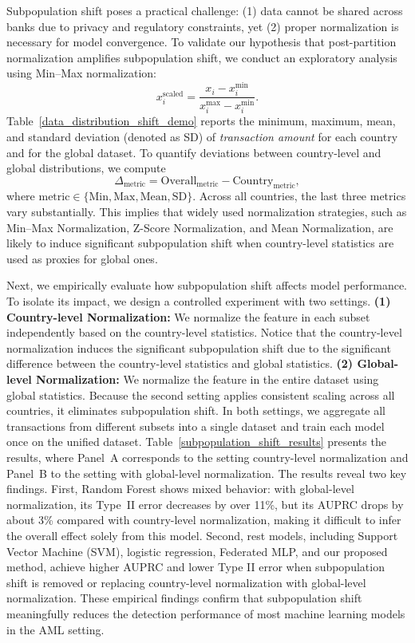 \documentclass[11pt,english]{article}
\begin{document}
Subpopulation shift poses a practical challenge: (1) data cannot be shared across banks due to privacy and regulatory constraints, yet (2) proper normalization is necessary for model convergence. To validate our hypothesis that post-partition normalization amplifies subpopulation shift, we conduct an exploratory analysis using Min--Max normalization:
\begin{equation}
    \label{min_max_normalization}
    x^{\text{scaled}}_i = \frac{x_i - x^{\text{min}}_i}{x^{\text{max}}_i - x^{\text{min}}_i}.
\end{equation}
Table~\ref{data_distribution_shift_demo} reports the minimum, maximum, mean, and standard deviation (denoted as SD) of \emph{transaction amount} for each country and for the global dataset. To quantify deviations between country-level and global distributions, we compute
\begin{equation}
    \Delta_{\text{metric}} = \text{Overall}_{\text{metric}} - \text{Country}_{\text{metric}},
\end{equation}
where $\text{metric} \in \{\text{Min}, \text{Max}, \text{Mean}, \text{SD}\}$. Across all countries, the last three metrics vary substantially. This implies that widely used normalization strategies, such as Min--Max Normalization, Z-Score Normalization, and Mean Normalization, are likely to induce significant subpopulation shift when country-level statistics are used as proxies for global ones.

Next, we empirically evaluate how subpopulation shift affects model performance. To isolate its impact, we design a controlled experiment with two settings. \textbf{(1) Country-level Normalization:} We normalize the feature in each subset independently based on the country-level statistics. Notice that the country-level normalization induces the significant subpopulation shift due to the significant difference between the country-level statistics and global statistics. \textbf{(2) Global-level Normalization:} We normalize the feature in the entire dataset using global statistics. Because the second setting applies consistent scaling across all countries, it eliminates subpopulation shift. In both settings, we aggregate all transactions from different subsets into a single dataset and train each model once on the unified dataset. Table~\ref{subpopulation_shift_results} presents the results, where Panel~A corresponds to the setting country-level normalization and Panel~B to the setting with global-level normalization. The results reveal two key findings. First, Random Forest shows mixed behavior: with global-level normalization, its Type~II error decreases by over 11\%, but its AUPRC drops by about 3\% compared with country-level normalization, making it difficult to infer the overall effect solely from this model. Second, rest models, including Support Vector Machine (SVM), logistic regression, Federated MLP, and our proposed method, achieve higher AUPRC and lower Type II error when subpopulation shift is removed or replacing country-level normalization with global-level normalization. These empirical findings confirm that subpopulation shift meaningfully reduces the detection performance of most machine learning models in the AML setting. 
\end{document}
